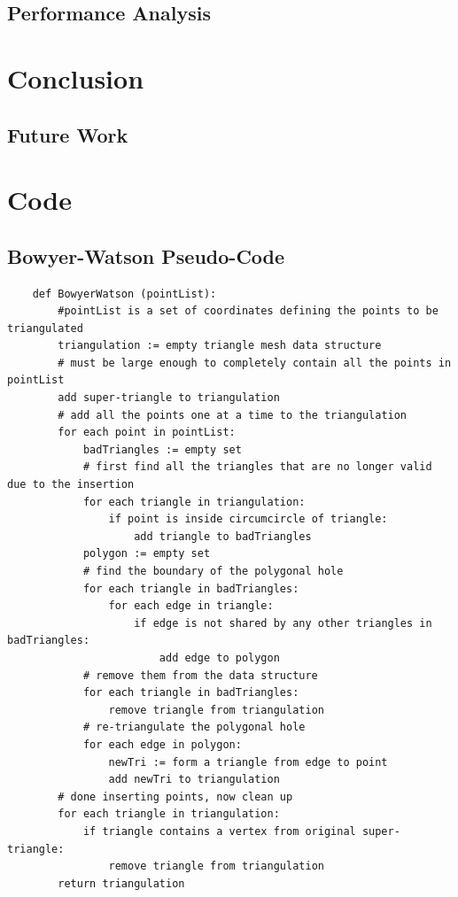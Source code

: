 \documentclass[fyp]{socreport}
\begin{document}
\section{Performance Analysis}

\chapter{Conclusion}

\section{Future Work}




\appendix
\chapter{Code}
\section{Bowyer-Watson Pseudo-Code}
\label{code:a1}
\begin{lstlisting}
	def BowyerWatson (pointList):
		#pointList is a set of coordinates defining the points to be triangulated
		triangulation := empty triangle mesh data structure
		# must be large enough to completely contain all the points in pointList
		add super-triangle to triangulation 
		# add all the points one at a time to the triangulation
		for each point in pointList: 
			badTriangles := empty set
			# first find all the triangles that are no longer valid due to the insertion
			for each triangle in triangulation: 
				if point is inside circumcircle of triangle:
					add triangle to badTriangles
			polygon := empty set
			# find the boundary of the polygonal hole
			for each triangle in badTriangles: 
				for each edge in triangle:
					if edge is not shared by any other triangles in badTriangles:
						add edge to polygon
			# remove them from the data structure
			for each triangle in badTriangles:
				remove triangle from triangulation
			# re-triangulate the polygonal hole
			for each edge in polygon:
				newTri := form a triangle from edge to point
				add newTri to triangulation
		# done inserting points, now clean up
		for each triangle in triangulation:
			if triangle contains a vertex from original super-triangle:
				remove triangle from triangulation
		return triangulation
\end{lstlisting}
\end{document}

